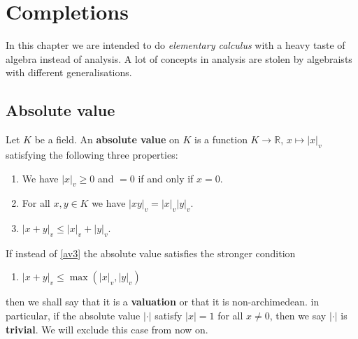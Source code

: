 \chapter{Completions}
	In this chapter we are intended to do \textit{elementary calculus} with a heavy taste of algebra instead of analysis. A lot of concepts in analysis are stolen by algebraists with different generalisations.
	\section{Absolute value}
		Let $K$ be a field. An \textbf{absolute value} on $K$ is a function $K \to \mathbb{R}$, $x \mapsto |x|_v$ satisfying the following three properties:
		\begin{enumerate}[start=1,label={\bfseries AV \arabic*}]
			\item We have $|x|_v \ge 0$ and $=0$ if and only if $x = 0$.
			\item For all $x,y \in K$ we have $|xy|_v = |x|_v|y|_v$.
			\item $|x+y|_v \le |x|_v + |y|_v$. \label{av3}
		\end{enumerate}
	
		If instead of \ref{av3} the absolute value satisfies the stronger condition
		\begin{enumerate}[start=4,label={\bfseries AV \arabic*}]
			\item $|x+y|_v \le \max(|x|_v,|y|_v)$
		\end{enumerate}
		then we shall say that it is a \textbf{valuation} or that it is non-archimedean. in particular, if the absolute value $|\cdot|$ satisfy $|x|=1$ for all $x \ne 0$, then we say $|\cdot|$ is \textbf{trivial}. We will exclude this case from now on. 
